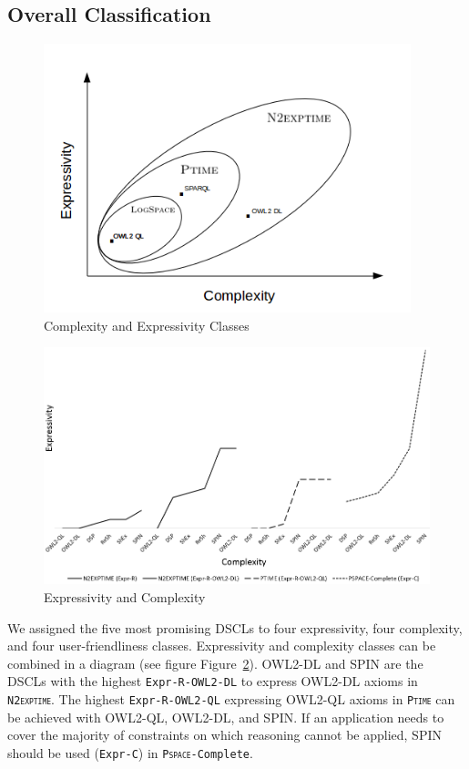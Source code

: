 \documentclass{llncs}
\newcommand{\ms}[1]{\texttt{#1}}
\begin{document}
\subsection{Overall Classification}
 
\begin{figure}
	\centering
		\includegraphics[width=0.95\textwidth]{complexiity_and_expressivity.png}
	\caption{Complexity and Expressivity Classes}
	\label{fig:VennDiagram}
\end{figure}
  
\begin{figure}
	\centering
		\includegraphics[width=1.00\textwidth]{expressivity-complexity-3.png}
	\caption{Expressivity and Complexity}
	\label{fig:expressivity-complexity}
\end{figure}

We assigned the five most promising DSCLs to four expressivity, four complexity, and four user-friendliness classes.
Expressivity and complexity classes can be combined in a diagram (see figure Figure~\ref{fig:expressivity-complexity}).
OWL2-DL and SPIN are the DSCLs with the highest \ms{Expr-R-OWL2-DL} to express OWL2-DL axioms in \ms{\textsc{N2exptime}}.
The highest \ms{Expr-R-OWL2-QL} expressing OWL2-QL axioms in \ms{\textsc{Ptime}} can be achieved with OWL2-QL, OWL2-DL, and SPIN.
If an application needs to cover the majority of constraints on which reasoning cannot be applied, SPIN should be used (\ms{Expr-C}) in \ms{\textsc{Pspace}-Complete}.
\end{document}
